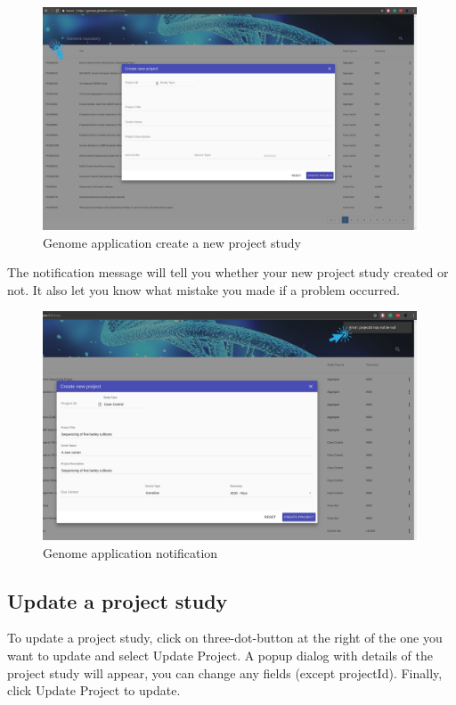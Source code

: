 \documentclass[a4paper,12pt]{article}
\begin{document}
\begin{figure}[H]
\centering
\includegraphics[width=0.99\textwidth]{images/genome-create}
\caption{Genome application create a new project study}
\end{figure}

The notification message will tell you whether your new project study created or not. It also let you know what mistake you made if a problem occurred.

\begin{figure}[H]
\centering
\includegraphics[width=0.99\textwidth]{images/genome-create-notification}
\caption{Genome application notification}
\end{figure}

\subsection{Update a project study}
To update a project study, click on three-dot-button at the right of the one you want to update and select Update Project. A popup dialog with details of the project study will appear, you can change any fields (except projectId). Finally, click Update Project to update.
\end{document}

